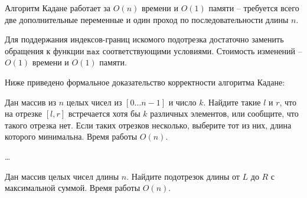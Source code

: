 \begin{solution}
    \leavevmode\vspace{1pt}
    

    Алгоритм Кадане работает за \( O(n) \) времени и \( O(1) \) памяти -- требуется всего две
    дополнительные переменные и один проход по последовательности длины $n$.

    Для поддержания индексов-границ искомого подотрезка достаточно заменить обращения к функции $\mathtt{max}$
    соответствующими условиями. Стоимость изменений -- \( O(1) \) времени и \( O(1) \) памяти.

    Ниже приведено формальное доказательство корректности алгоритма Кадане:
    
\end{solution}


\begin{problem}
    Дан массив из $n$ целых чисел из $[0 \ldots n-1]$ и число $k$. Найдите такие $l$ и $r$, что на отрезке $[l, r]$ встречается хотя бы $k$ различных элементов, или сообщите, что такого отрезка нет. Если таких отрезков несколько, выберите тот из них, длина которого минимальна. Время работы $O(n)$.
\end{problem}

\begin{solution}
    \dots
\end{solution}


\begin{problem}
    Дан массив целых чисел длины $n$. Найдите подотрезок длины
    от $L$ до $R$ с максимальной суммой. Время работы $O(n)$.
\end{problem}


